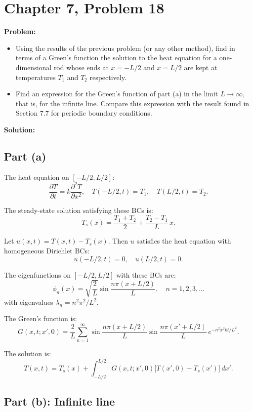 \documentclass[12pt]{article}
\begin{document}
\section*{Chapter 7, Problem 18}

\textbf{Problem:}
\begin{itemize}
\item[a)] Using the results of the previous problem (or any other method), find in terms of a Green's function the solution to the heat equation for a one-dimensional rod whose ends at $x = -L/2$ and $x = L/2$ are kept at temperatures $T_1$ and $T_2$ respectively.
\item[b)] Find an expression for the Green's function of part (a) in the limit $L \to \infty$, that is, for the infinite line. Compare this expression with the result found in Section 7.7 for periodic boundary conditions.
\end{itemize}

\bigskip
\textbf{Solution:}

\subsection*{Part (a)}

The heat equation on $[-L/2, L/2]$:
\[
\frac{\partial T}{\partial t} = k\frac{\partial^2 T}{\partial x^2}, \quad T(-L/2,t) = T_1,\quad T(L/2,t) = T_2.
\]

The steady-state solution satisfying these BCs is:
\[
T_s(x) = \frac{T_1 + T_2}{2} + \frac{T_2 - T_1}{L}\,x.
\]

Let $u(x,t) = T(x,t) - T_s(x)$. Then $u$ satisfies the heat equation with homogeneous Dirichlet BCs:
\[
u(-L/2,t) = 0, \quad u(L/2,t) = 0.
\]

The eigenfunctions on $[-L/2, L/2]$ with these BCs are:
\[
\phi_n(x) = \sqrt{\frac{2}{L}}\sin\frac{n\pi(x + L/2)}{L}, \quad n = 1,2,3,\ldots
\]
with eigenvalues $\lambda_n = n^2\pi^2/L^2$.

The Green's function is:
\[
G(x,t;x',0) = \frac{2}{L}\sum_{n=1}^{\infty}\sin\frac{n\pi(x+L/2)}{L}\sin\frac{n\pi(x'+L/2)}{L}\,e^{-n^2\pi^2 kt/L^2}.
\]

The solution is:
\[
T(x,t) = T_s(x) + \int_{-L/2}^{L/2}G(x,t;x',0)\bigl[T(x',0) - T_s(x')\bigr]\,dx'.
\]

\subsection*{Part (b): Infinite line}
\end{document}
